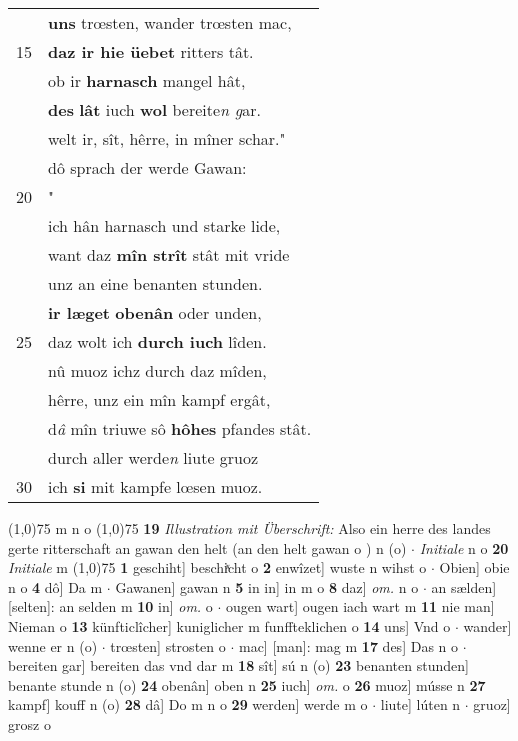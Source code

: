 \documentclass[8pt,a4paper,notitlepage]{article}
\begin{document}
\begin{table}[ht]
\begin{minipage}[t]{0.5\linewidth}
\begin{tabular}{rl}
 & \textbf{uns} trœsten, wander trœsten mac,\\ 
15 & \textbf{daz ir hie üebet} ritters tât.\\ 
 & ob ir \textbf{harnasch} mangel hât,\\ 
 & \textbf{des} \textbf{lât} iuch \textbf{wol} bereite\textit{n g}ar.\\ 
 & welt ir, sît, hêrre, in mîner schar."\\ 
 & dô sprach der werde Gawan:\\ 
20 & "\textbf{\begin{large}I\end{large}ch} wære des ein bereiter man.\\ 
 & ich hân harnasch und starke lide,\\ 
 & want daz \textbf{mîn strît} stât mit vride\\ 
 & unz an eine benanten stunden.\\ 
 & \textbf{ir læget} \textbf{obenân} oder unden,\\ 
25 & daz wolt ich \textbf{durch iuch} lîden.\\ 
 & nû muoz ichz durch daz mîden,\\ 
 & hêrre, unz ein mîn kampf ergât,\\ 
 & d\textit{â} mîn triuwe sô \textbf{hôhes} pfandes stât.\\ 
 & durch aller werde\textit{n} liute gruoz\\ 
30 & ich \textbf{si} mit kampfe lœsen muoz.\\ 
\end{tabular}
\scriptsize
\line(1,0){75} \newline
m n o \newline
\line(1,0){75} \newline
\textbf{19} \textit{Illustration mit Überschrift:} Also ein herre des landes gerte ritterschaft an gawan den helt (an den helt gawan o  ) n (o)   $\cdot$ \textit{Initiale} n o  \textbf{20} \textit{Initiale} m  \newline
\line(1,0){75} \newline
\textbf{1} geschiht] beschiͯcht o \textbf{2} enwîzet] wuste n wihst o  $\cdot$ Obien] obie n o \textbf{4} dô] Da m  $\cdot$ Gawanen] gawan n \textbf{5} in in] in m o \textbf{8} daz] \textit{om.} n o  $\cdot$ an sælden] [selten]: an selden m \textbf{10} in] \textit{om.} o  $\cdot$ ougen wart] ougen iach wart m \textbf{11} nie man] Nieman o \textbf{13} künfticlîcher] kuniglicher m funffteklichen o \textbf{14} uns] Vnd o  $\cdot$ wander] wenne er n (o)  $\cdot$ trœsten] strosten o  $\cdot$ mac] [man]: mag m \textbf{17} des] Das n o  $\cdot$ bereiten gar] bereiten das vnd dar m \textbf{18} sît] sú n (o) \textbf{23} benanten stunden] benante stunde n (o) \textbf{24} obenân] oben n \textbf{25} iuch] \textit{om.} o \textbf{26} muoz] músse n \textbf{27} kampf] kouff n (o) \textbf{28} dâ] Do m n o \textbf{29} werden] werde m o  $\cdot$ liute] lúten n  $\cdot$ gruoz] grosz o \newline
\end{minipage}
\end{table}
\end{document}
